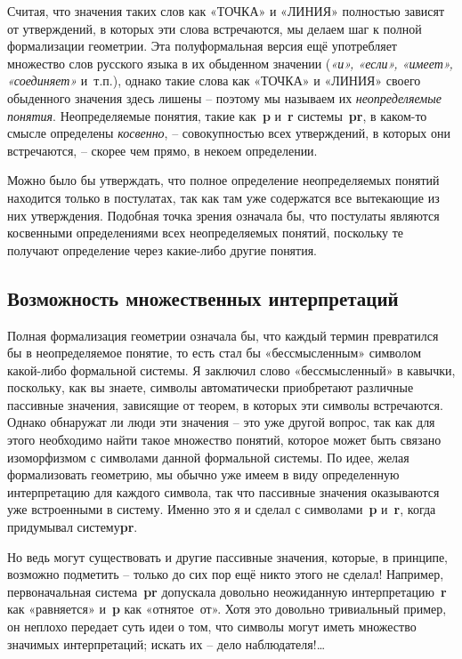 \documentclass[../main.tex]{subfiles}
\begin{document}
Считая, что значения таких слов как «ТОЧКА» и «ЛИНИЯ» полностью зависят от утверждений, в которых эти слова встречаются, мы делаем шаг к полной формализации геометрии. Эта полуформальная версия ещё употребляет множество слов русского языка в их обыденном значении (\emph{«и», «если», «имеет», «соединяет»} и~т.п.), однако такие слова как «ТОЧКА» и «ЛИНИЯ» своего обыденного значения здесь лишены \--- поэтому мы называем их \emph{неопределяемые понятия}. Неопределяемые понятия, такие как~\textbf{p} и~\textbf{r} системы~\textbf{pr}, в каком-то смысле определены \emph{косвенно}, \--- совокупностью всех утверждений, в которых они встречаются, \--- скорее чем прямо, в некоем определении.

Можно было бы утверждать, что полное определение неопределяемых понятий находится только в постулатах, так как там уже содержатся все вытекающие из них утверждения. Подобная точка зрения означала бы, что постулаты являются косвенными определениями всех неопределяемых понятий, поскольку те получают определение через какие-либо другие понятия.


\subsection{Возможность множественных интерпретаций}

Полная формализация геометрии означала бы, что каждый термин превратился бы в неопределяемое понятие, то есть стал бы «бессмысленным» символом какой-либо формальной системы. Я заключил слово «бессмысленный» в кавычки, поскольку, как вы знаете, символы автоматически приобретают различные пассивные значения, зависящие от теорем, в которых эти символы встречаются. Однако обнаружат ли люди эти значения \--- это уже другой вопрос, так как для этого необходимо найти такое множество понятий, которое может быть связано изоморфизмом с символами данной формальной системы. По идее, желая формализовать геометрию, мы обычно уже имеем в виду определенную интерпретацию для каждого символа, так что пассивные значения оказываются уже встроенными в систему. Именно это я и сделал с символами~\textbf{p} и~\textbf{r}, когда придумывал систему\textbf{pr}.

Но ведь могут существовать и другие пассивные значения, которые, в принципе, возможно подметить \--- только до сих пор ещё никто этого не сделал! Например, первоначальная система~\textbf{pr} допускала довольно неожиданную интерпретацию~\textbf{r} как «равняется» и~\textbf{p} как «отнятое~от». Хотя это довольно тривиальный пример, он неплохо передает суть идеи о том, что символы могут иметь множество значимых интерпретаций; искать их \--- дело наблюдателя!\ldots{}
\end{document}
